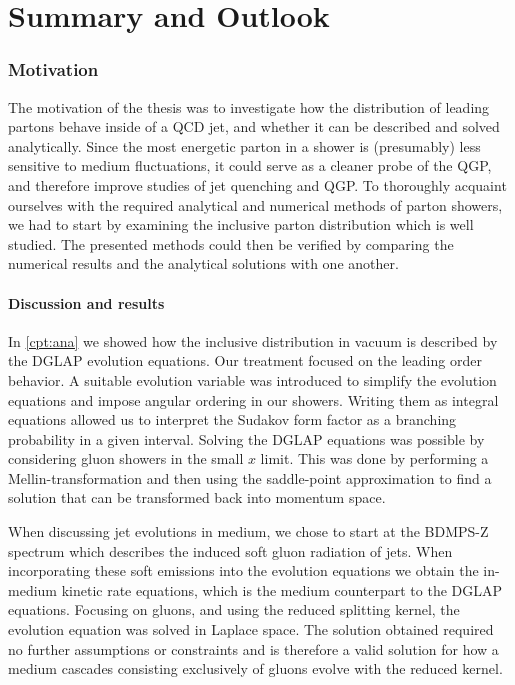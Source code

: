 \documentclass[main.tex]{subfiles}
\begin{document}
\chapter*{Summary and Outlook}\label{cpt:sumout} 

\subsection*{Motivation}
The motivation of the thesis was to investigate how the distribution of leading partons behave inside of a QCD jet, and whether it can be described and solved analytically. Since the most energetic parton in a shower is (presumably) less sensitive to medium fluctuations, it could serve as a cleaner probe of the QGP, and therefore improve studies of jet quenching and QGP. To thoroughly acquaint ourselves with the required analytical and numerical methods of parton showers, we had to start by examining the inclusive parton distribution which is well studied. The presented methods could then be verified by comparing the numerical results and the analytical solutions with one another.

\subsubsection*{Discussion and results}
In \autoref{cpt:ana} we showed how the inclusive distribution in vacuum is described by the DGLAP evolution equations. Our treatment focused on the leading order behavior. A suitable evolution variable was introduced to simplify the evolution equations and impose angular ordering in our showers. Writing them as integral equations allowed us to interpret the Sudakov form factor as a branching probability in a given interval. Solving the DGLAP equations was possible by considering gluon showers in the small \(x\) limit. This was done by performing a Mellin-transformation and then using the saddle-point approximation to find a solution that can be transformed back into momentum space. 

When discussing jet evolutions in medium, we chose to start at the BDMPS-Z spectrum which describes the induced soft gluon radiation of jets. When incorporating these soft emissions into the evolution equations we obtain the in-medium kinetic rate equations, which is the medium counterpart to the DGLAP equations. Focusing on gluons, and using the reduced splitting kernel, the evolution equation was solved in Laplace space. The solution obtained required no further assumptions or constraints and is therefore a valid solution for how a medium cascades consisting exclusively of gluons evolve with the reduced kernel.
\end{document}

